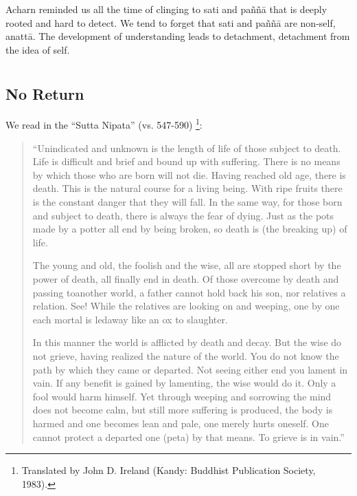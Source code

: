 Acharn reminded us all the time of clinging to sati and paññā that is
deeply rooted and hard to detect. We tend to forget that sati and paññā
are non-self, anattā. The development of understanding leads to
detachment, detachment from the idea of self.



\chapter[No Return]{}
\section*{No Return}

We read in the ``Sutta Nipata'' (vs. 547-590)
\footnote{Translated by John D. Ireland
(Kandy: Buddhist Publication Society, 1983).}:

\begin{quote}
``Unindicated and unknown is the length of life of those subject to
death. Life is difficult and brief and bound up with suffering. There is no means by
which those who are born will not die. Having reached old age, there is death.
This is the natural course for a living being. With ripe fruits there is the
constant danger that they will fall. In the same way, for those born and subject
to death, there is always the fear of dying. Just as the pots made by a
potter all end by being broken, so death is (the breaking up) of life.

The young and old, the foolish and the wise, all are stopped short by
the power of death, all finally end in death. Of those overcome by death
and passing toanother world, a father cannot hold back his son, nor
relatives a relation. See! While the relatives are looking on and
weeping, one by one each mortal is ledaway like an ox to slaughter.

In this manner the world is afflicted by death and decay. But the wise
do not grieve, having realized the nature of the world. You do not know the
path by which they came or departed. Not seeing either end you lament in vain.
If any benefit is gained by lamenting, the wise would do it. Only a fool would
harm himself. Yet through weeping and sorrowing the mind does not become
calm, but still more suffering is produced, the body is harmed and one
becomes lean and pale, one merely hurts oneself. One cannot protect a
departed one (peta) by that means. To grieve is in vain.''

\end{quote}

